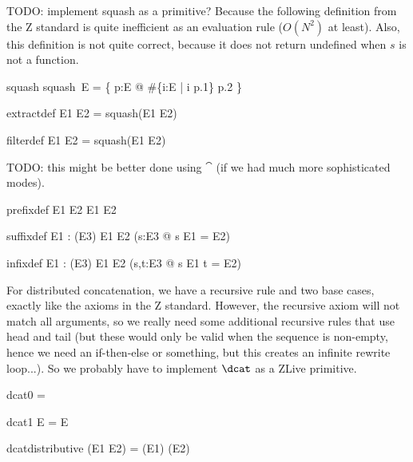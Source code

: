 \documentclass{article}
\begin{document}
TODO: implement squash as a primitive?
Because the following definition from the Z standard is quite 
inefficient as an evaluation rule ($O(N^2)$ at least).  
Also, this definition is not quite correct, because it does
not return undefined when $s$ is not a function.
\begin{zedrule}{squash}
   squash~E = \{ p:E @ \#\{i:\dom E | i \leq p.1\} \mapsto p.2 \}
\end{zedrule}

\begin{zedrule}{extractdef}
   E1 \extract E2 = squash(E1 \dres E2)
\end{zedrule}

\begin{zedrule}{filterdef}
   E1 \filter E2 = squash(E1 \rres E2)
\end{zedrule}

TODO: this might be better done using $\cat$
(if we had much more sophisticated modes).
\begin{zedrule}{prefixdef}
   E1 \prefix E2 \iff E1 \subseteq E2
\end{zedrule}

\begin{zedrule}{suffixdef}
   \proviso E1 : \power (\arithmos \cross E3)
\derives
   E1 \suffix E2 \iff (\exists s:\seq E3 @ s \cat E1 = E2)
\end{zedrule}

\begin{zedrule}{infixdef}
   \proviso E1 : \power (\arithmos \cross E3)
\derives
   E1 \infix E2 \iff (\exists s,t:\seq E3 @ s \cat E1 \cat t = E2)
\end{zedrule}

For distributed concatenation, we have a recursive rule and
two base cases, exactly like the axioms in the Z standard.
However, the recursive axiom will not match all arguments,
so we really need some additional recursive rules that use 
head and tail (but these would only be valid when the sequence
is non-empty, hence we need an if-then-else or something, but this
creates an infinite rewrite loop...).  So we probably have to
implement $\dcat$ as a ZLive primitive. 
\begin{zedrule}{dcat0}
   \dcat \langle \rangle = \langle \rangle
\end{zedrule}
\begin{zedrule}{dcat1}
   \dcat \langle E \rangle = E
\end{zedrule}
\begin{zedrule}{dcatdistributive}
   \dcat (E1 \cat E2) = (\dcat E1) \cat (\dcat E2)
\end{zedrule}

\end{document}
